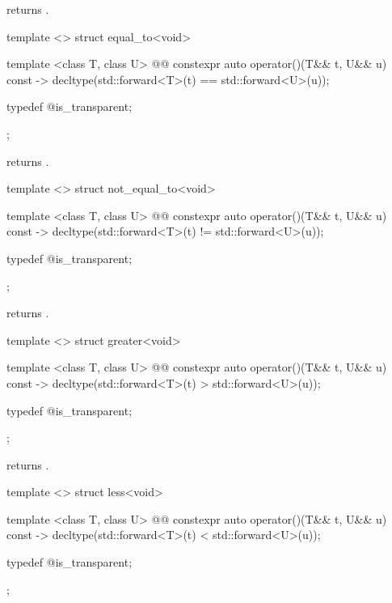 \begin{itemdescr}
\pnum
{} returns .
\end{itemdescr}

%
\begin{itemdecl}
template <> struct equal_to<void> {
  template <class T, class U>
    @@
  constexpr auto operator()(T&& t, U&& u) const
    -> decltype(std::forward<T>(t) == std::forward<U>(u));

  typedef @\unspec@ is_transparent;
};
\end{itemdecl}

\begin{itemdescr}
\pnum
{} returns .
\end{itemdescr}

%
\begin{itemdecl}
template <> struct not_equal_to<void> {
  template <class T, class U>
    @@
  constexpr auto operator()(T&& t, U&& u) const
    -> decltype(std::forward<T>(t) != std::forward<U>(u));

  typedef @\unspec@ is_transparent;
};
\end{itemdecl}

\begin{itemdescr}
\pnum
{} returns .
\end{itemdescr}

%
\begin{itemdecl}
template <> struct greater<void> {
  template <class T, class U>
    @@
  constexpr auto operator()(T&& t, U&& u) const
    -> decltype(std::forward<T>(t) > std::forward<U>(u));

  typedef @\unspec@ is_transparent;
};
\end{itemdecl}

\begin{itemdescr}
\pnum
{} returns .
\end{itemdescr}

%
\begin{itemdecl}
template <> struct less<void> {
  template <class T, class U>
    @@
  constexpr auto operator()(T&& t, U&& u) const
    -> decltype(std::forward<T>(t) < std::forward<U>(u));

  typedef @\unspec@ is_transparent;
};
\end{itemdecl}

